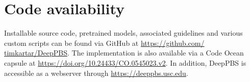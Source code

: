 \section{Code availability}
Installable source code, pretrained models, associated guidelines and
various custom scripts can be found via GitHub at \url{https://github.com/
timkartar/DeepPBS}. The implementation is also available via a Code
Ocean capsule at \url{https://doi.org/10.24433/CO.0545023.v2}. In addition,
DeepPBS is accessible as a webserver through \url{https://deeppbs.usc.edu}.
